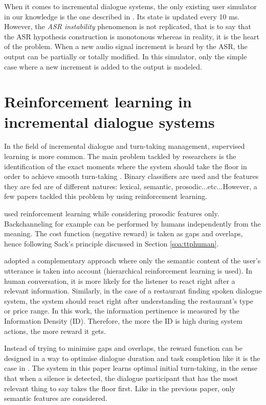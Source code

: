 			When it comes to incremental dialogue systems, the only existing user simulator in our knowledge is the one described in \cite{Selfridge2012b}. Its state is updated every 10 ms. However, the \textit{ASR instability} phenomenon is not replicated, that is to say that the ASR hypothesis construction is monotonous whereas in reality, it is the heart of the problem. When a new audio signal increment is heard by the ASR, the output can be partially or totally modified. In this simulator, only the simple case where a new increment is added to the output is modeled.
				
\section{Reinforcement learning in incremental dialogue systems}

	In the field of incremental dialogue and turn-taking management, supervised learning is more common. The main problem tackled by researchers is the identification of the exact moments where the system should take the floor in order to achieve smooth turn-taking \cite{Raux2008,Gravano2011,Meena2013}. Binary classifiers are used and the features they are fed are of different natures: lexical, semantic, prosodic...etc...However, a few papers tackled this problem by using reinforcement learning.
        
	\cite{Jonsdottir2008} used reinforcement learning while considering prosodic features only. Backchanneling for example can be performed by humans independently from the meaning. The cost function (negative reward) is taken as gaps and overlaps, hence following Sack's principle discussed in Section \ref{soa:ttphuman}.
	
	\cite{Dethlefs2012} adopted a complementary approach where only the semantic content of the user's utterance is taken into account (hierarchical reinforcement learning is used). In human conversation, it is more likely for the listener to react right after a relevant information. Similarly, in the case of a restaurant finding spoken dialogue system, the system should react right after understanding the restaurant's type or price range. In this work, the information pertinence is measured by the Information Density (ID). Therefore, the more the ID is high during system actions, the more reward it gets.
	
	Instead of trying to minimise gaps and overlaps, the reward function can be designed in a way to optimise dialogue duration and task completion like it is the case in \cite{Selfridge2010}. The system in this paper learns optimal initial turn-taking, in the sense that when a silence is detected, the dialogue participant that has the most relevant thing to say takes the floor first. Like in the previous paper, only semantic features are considered.
	
